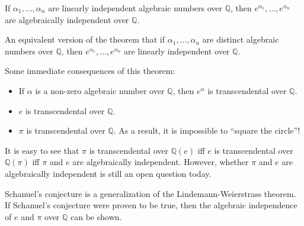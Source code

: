 \documentclass[12pt]{article}
\begin{document}
If $\alpha_1,\ldots,\alpha_n$ are linearly independent algebraic numbers over $\mathbb{Q}$, then $e^{\alpha_1},\ldots,e^{\alpha_n}$ are algebraically independent over $\mathbb{Q}$.

An equivalent version of the theorem  that if $\alpha_1,\ldots,\alpha_n$ are distinct algebraic numbers over $\mathbb{Q}$, then $e^{\alpha_1},\ldots,e^{\alpha_n}$ are linearly independent over $\mathbb{Q}$.

Some immediate consequences of this theorem:
\begin{itemize}
\item
If $\alpha$ is a non-zero algebraic number over $\mathbb{Q}$, then $e^{\alpha}$ is transcendental over $\mathbb{Q}$.
\item
$e$ is transcendental over $\mathbb{Q}$. 
\item
$\pi$ is transcendental over $\mathbb{Q}$.  As a result, it is impossible to ``square the circle''!
\end{itemize}

It is easy to see that $\pi$ is transcendental over $\mathbb{Q}(e)$ iff $e$ is transcendental over $\mathbb{Q}(\pi)$ iff $\pi$ and $e$ are algebraically independent.  However, whether $\pi$ and $e$ are algebraically independent is still an open question today.

Schanuel's conjecture is a generalization of the Lindemann-Weierstrass theorem.  If Schanuel's conjecture were proven to be true, then the algebraic independence of $e$ and $\pi$ over $\mathbb{Q}$ can be shown.
\end{document}
